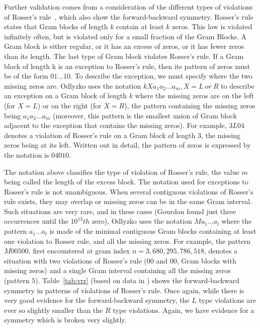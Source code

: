 \documentclass[twoside]{article}
\theoremstyle{definition}
\begin{document}
Further validation comes from a consideration of the different types of violations of Rosser's rule~\cite{gourdon}, which also show the forward-backward symmetry. Rosser's rule states that Gram blocks of length $k$ contain at least $k$ zeros. This law is violated infinitely often, but is violated only for a small fraction of the Gram Blocks. A Gram block is either regular, or it has an excess of zeros, or it has fewer zeros than its length. The last type of Gram block violates Rosser's rule. 
If a Gram block of length k is an exception to Rosser's rule, then its pattern of zeros must be of the form $01...10$. To describe the exception, we must specify where the two missing zeros are. Odlyzko uses the notation $kXa_1a_2 . . . a_m, X = L~or~R $ 
to describe an exception on a Gram block of length $k$  where the missing zeros are on the left (for $X = L$) or on the right (for $X = R$), the pattern containing the missing zeros being $a_1a_2 . . . a_m$ (moreover, this pattern is the smallest union of Gram block adjacent to the exception that contains the missing zeros). For example, $3L04$ denotes a violation of Rosser's rule on a Gram block of length 3, the missing zeros being at its left. Written out in detail, the pattern of zeros is expressed by the notation is $04010$.

The notation above classifies the type of violation of Rosser's rule, the value $m$ being called the length of the excess block. The notation used for exceptions to Rosser's rule is not unambiguous. When several contiguous violations of Rosser's rule exists, they may overlap or missing zeros can be in the same Gram interval. Such situations are very rare, and in these cases (Gourdon found just three occurrences until the $10^{13}th$ zero), Odlyzko uses the notation $Ma_1 ...a_l$ where the pattern $a_1 . . . a_l$ is made of the minimal contiguous Gram blocks containing at least one violation to Rosser rule, and all the missing zeros. For example, the pattern $M00500$, first encountered at gram index $n = 3,680,295,786,518$, denotes a situation with two violations of Rosser's rule ($00$ and $00$, Gram blocks with missing zeros) and a single Gram interval containing all the missing zeros (pattern $5$). 
Table~\ref{tab:vrr}  (based on data in \cite{gourdon}) shows the forward-backward symmetry in patterns of violations of Rosser's rule. Once again, while there is very good evidence for the forward-backward symmetry, the $L$ type violations are ever so slightly smaller than the $R$ type violations. Again, we have evidence for a symmetry which is broken very slightly.
\end{document}
